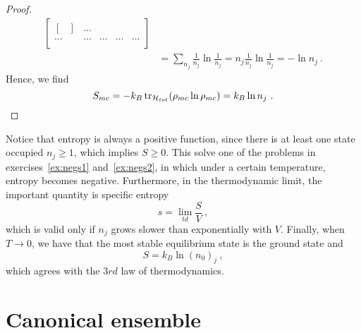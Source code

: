 \begin{proof}
\begin{equation*}
\begin{aligned}
\begin{bmatrix}
\begin{bmatrix}
                \end{bmatrix} & \ldots \\
                \ldots & \ldots & \ldots & \ldots & \ldots  \\
            \end{bmatrix} \\ & = \sum_{n_j} \frac{1}{n_j} \ln \frac{1}{n_j} = n_j \frac{1}{n_j} \ln \frac{1}{n_j} = - \ln n_j ~.
        \end{aligned}
        \end{equation*}
        Hence, we find
        \begin{equation*}
            S_{mc} = - k_B \operatorname{tr}_{\mathcal H_{tot}} ( \rho_{mc} \ln \rho_{mc}) = k_B \ln n_j ~.
        \end{equation*}
    \end{proof}

    Notice that entropy is always a positive function, since there is at least one state occupied $n_j \geq 1$, which implies $S \geq 0$. This solve one of the problems in exercises~\eqref{ex:negs1} and~\eqref{ex:negs2}, in which under a certain temperature, entropy becomes negative. Furthermore, in the thermodynamic limit, the important quantity is specific entropy 
    \begin{equation*}
        s = \lim_{td} \frac{S}{V} ~,
    \end{equation*}
    which is valid only if $n_j$ grows slower than exponentially with $V$.
    Finally, when $T \rightarrow 0$, we have that the most stable equilibrium state is the ground state and 
    \begin{equation*}
        S = k_B \ln {(n_0)}_j ~,
    \end{equation*}
    which agrees with the $3rd$ law of thermodynamics.

\section{Canonical ensemble}


